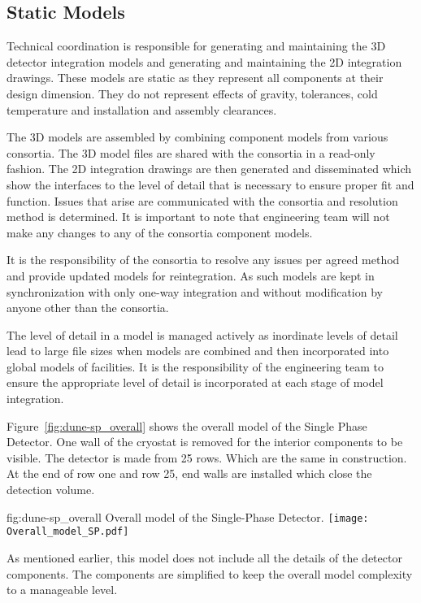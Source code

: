 \subsection{Static Models}
\label{sec:fdsp-coord-integ-static}
Technical coordination is responsible for generating and maintaining
the 3D detector integration models and generating and maintaining the
2D integration drawings. These models are static as they represent all
components at their design dimension. They do not represent effects of
gravity, tolerances, cold temperature and installation and assembly
clearances.

The 3D models are assembled by combining component models from various
consortia. The 3D model files are shared with the consortia in a
read-only fashion. The 2D integration drawings are then generated and
disseminated which show the interfaces to the level of detail that is
necessary to ensure proper fit and function. Issues that arise are
communicated with the consortia and resolution method is
determined. It is important to note that  engineering team
will not make any changes to any of the consortia component models.

It is the responsibility of the consortia to resolve any issues per
agreed method and provide updated models for reintegration. As such
models are kept in synchronization with only one-way integration and
without modification by anyone other than the consortia.

The level of detail in a model is managed actively as inordinate
levels of detail lead to large file sizes when models are combined and
then incorporated into global models of facilities. It is the
responsibility of the  engineering team to ensure the
appropriate level of detail is incorporated at each stage of model
integration.

Figure~\ref{fig:dune-sp_overall} shows the overall model of the Single Phase Detector. One wall of the 
cryostat is removed for the interior components to be visible. The detector is made from 25 rows. 
Which are the same in construction. At the end of row one and row 25, end walls are
installed which close the detection volume.
\begin{dunefigure}{fig:dune-sp_overall}
  {Overall model of the Single-Phase Detector.}
  \texttt{[image: Overall\_model\_SP.pdf]}
\end{dunefigure}


As mentioned earlier, this model does not include all the details of
the detector components. The components are simplified to keep the
overall model complexity to a manageable level.


